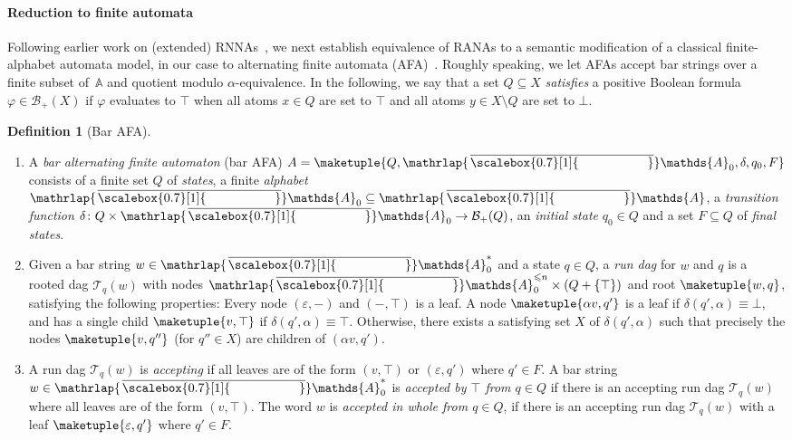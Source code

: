 \documentclass[10pt,a4paper]{amsart}
\theoremstyle{definition}
\newtheorem{defn}[theo]{Definition}
\newcommand{\seq}{\subseteq}
\newcommand{\At}{\mathds{A}}
\newcommand{\allbool}{\mathcal{B}}
\newcommand{\posbool}{\allbool_+}
\newcommand{\runtree}[3]{\mathcal{T}_{#1}^{#2}(#3)}
\newcommand{\names}{\At}
\newcommand{\set}[1]{\{#1\}}
\newcommand{\mybar}[3]{%
  \mathrlap{\hspace{#2}\overline{\scalebox{#1}[1]{\phantom{\ensuremath{#3}}}}}\ensuremath{#3}
}
\newcommand{\barNames}{{\mybar{0.7}{1.25pt}{\names}}}
\begin{document}
\paragraph*{Reduction to finite automata} Following earlier work on
(extended) RNNAs~\cite{skmw17,hms21}, we next establish equivalence of
RANAs to a semantic modification of a classical finite-alphabet
automata model, in our case to alternating finite automata
(AFA)~\cite{cks81}. Roughly speaking, we let AFAs accept bar strings
over a finite subset of~$\names$ and quotient modulo
$\alpha$-equivalence. In the following, we say that a set $Q \seq X$ \emph{satisfies} a positive Boolean formula
$\varphi \in \posbool(X)$ if $\varphi$ evaluates to $\top$ when all
atoms $x \in Q$ are set to $\top$ and all atoms $y \in X \setminus Q$ are
set to $\bot$.

\begin{defn}[Bar AFA]\label{defn:bafa}
  \begin{enumerate}
  \item A \emph{bar alternating finite automaton} (bar AFA) $A = \maketuple{Q, \barNames_0, \delta, q_0, F}$ consists of a finite set $Q$ of \emph{states}, a finite \emph{alphabet} $\barNames_0 \seq \barNames$, a \emph{transition function} $\delta\colon Q \times \barNames_0 \to \posbool(Q)$, an \emph{initial state} $q_0 \in Q$ and a set $F \seq Q$ of \emph{final states}.

  \item Given a bar string $w \in \barNames_0^*$ and a state $q \in Q$, a \emph{run dag} for $w$ and $q$ is a rooted dag $\runtree{q}{}{w}$ with nodes $\barNames_0^{\leqslant n} \times (Q + \set{\top})$ and root $\maketuple{w, q}$, satisfying the following properties: Every node $(\varepsilon,-)$ and $(-,\top)$ is a leaf. A node $\maketuple{\alpha v, q'}$ is a leaf if
    $\delta(q', \alpha) \equiv \bot$, and has a single child $\maketuple{v, \top}$ if \mbox{$\delta(q',\alpha)\equiv \top$}. Otherwise, there exists a satisfying
    set $X$ of $\delta(q', \alpha)$ such that precisely the nodes $\maketuple{v, q''}$ (for $q'' \in X$)
    are children of $(\alpha v,q')$.
    
  \item A run dag $\runtree{q}{}{w}$ is \emph{accepting} if all leaves are of the form $(v,\top)$ or $(\varepsilon,q')$ where $q'\in F$. A bar string $w \in \barNames_0^*$ is
    \emph{accepted by $\top$ from $q \in Q$} if there is an accepting run dag $\runtree{q}{}{w}$
    where all leaves are of the form $(v,\top)$. The word $w$ is \emph{accepted in whole from $q \in Q$}, if
    there is an accepting run dag $\runtree{q}{}{w}$ with a leaf $\maketuple{\varepsilon, q'}$ where
    $q' \in F$. %


\end{enumerate}
\end{defn}
\end{document}
